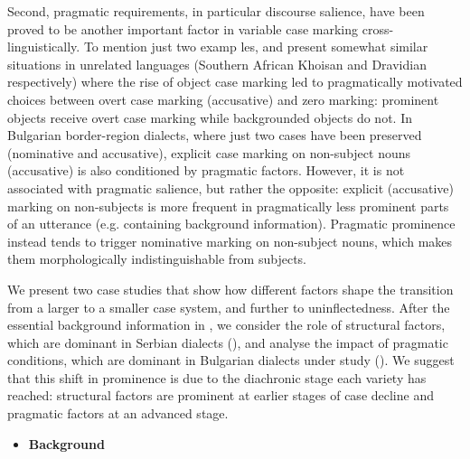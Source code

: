 \documentclass[output=paper]{langscibook}
\begin{document}
Second, pragmatic requirements, in particular discourse salience, have been proved to be another important factor in variable case marking cross-linguistically. To mention just two examp les, \citet{McGregor2018} and \citet{Montaut2018} present somewhat similar situations in unrelated languages (Southern African Khoisan and Dravidian respectively) where the rise of object case marking led to pragmatically motivated choices between overt case marking (accusative) and zero marking: prominent objects receive overt case marking while backgrounded objects do not. In Bulgarian border-region dialects, where just two cases have been preserved (nominative and accusative), explicit case marking on non-subject nouns (accusative) is also conditioned by pragmatic factors. However, it is not associated with pragmatic salience, but rather the opposite:  explicit (accusative) marking on non-subjects is more frequent in pragmatically less prominent parts of an utterance (e.g. containing background information). Pragmatic prominence instead tends to trigger nominative marking on non-subject nouns, which makes them morphologically indistinguishable from subjects. 

We present two case studies that show how different factors shape the transition from a larger to a smaller case system, and further to uninflectedness. After the essential background information in , we consider the role of structural factors, which are dominant in Serbian dialects (), and analyse the impact of   pragmatic conditions, which are dominant in Bulgarian dialects under study (). We suggest that this shift in prominence is due to the diachronic stage each variety has reached: structural factors are prominent at earlier stages of case decline and pragmatic factors at an advanced stage.

\begin{itemize}
\item \begin{styleListParagraph}
\textbf{Background}
\end{styleListParagraph}
\end{itemize}
\end{document}

